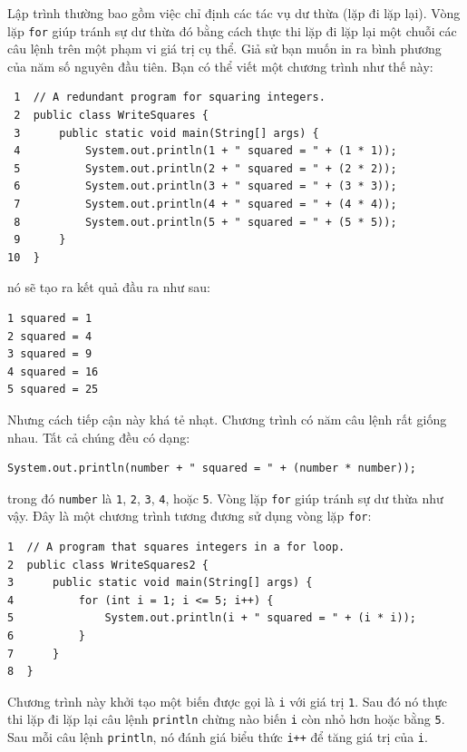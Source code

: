 Lập trình thường bao gồm việc chỉ định các tác vụ dư thừa (lặp đi lặp
lại). Vòng lặp \texttt{for} giúp tránh sự dư thừa đó bằng cách thực thi
lặp đi lặp lại một chuỗi các câu lệnh trên một phạm vi giá trị cụ thể.
Giả sử bạn muốn in ra bình phương của năm số nguyên đầu tiên. Bạn có thể
viết một chương trình như thế này:

\begin{verbatim}
 1  // A redundant program for squaring integers.
 2  public class WriteSquares {
 3      public static void main(String[] args) {
 4          System.out.println(1 + " squared = " + (1 * 1));
 5          System.out.println(2 + " squared = " + (2 * 2));
 6          System.out.println(3 + " squared = " + (3 * 3));
 7          System.out.println(4 + " squared = " + (4 * 4));
 8          System.out.println(5 + " squared = " + (5 * 5));
 9      }
10  }
\end{verbatim}

nó sẽ tạo ra kết quả đầu ra như sau:

\begin{verbatim}
1 squared = 1 
2 squared = 4 
3 squared = 9 
4 squared = 16 
5 squared = 25
\end{verbatim}

Nhưng cách tiếp cận này khá tẻ nhạt. Chương trình có năm câu lệnh rất
giống nhau. Tất cả chúng đều có dạng:

\begin{verbatim}
System.out.println(number + " squared = " + (number * number));
\end{verbatim}

trong đó \texttt{number} là \texttt{1}, \texttt{2}, \texttt{3},
\texttt{4}, hoặc \texttt{5}. Vòng lặp \texttt{for} giúp tránh sự dư thừa
như vậy. Đây là một chương trình tương đương sử dụng vòng lặp
\texttt{for}:

\begin{verbatim}
1  // A program that squares integers in a for loop.
2  public class WriteSquares2 {
3      public static void main(String[] args) {
4          for (int i = 1; i <= 5; i++) {
5              System.out.println(i + " squared = " + (i * i));
6          }
7      }
8  }
\end{verbatim}

Chương trình này khởi tạo một biến được gọi là \texttt{i} với giá trị
\texttt{1}. Sau đó nó thực thi lặp đi lặp lại câu lệnh \texttt{println}
chừng nào biến \texttt{i} còn nhỏ hơn hoặc bằng \texttt{5}. Sau mỗi câu
lệnh \texttt{println}, nó đánh giá biểu thức \texttt{i++} để tăng giá
trị của \texttt{i}.


